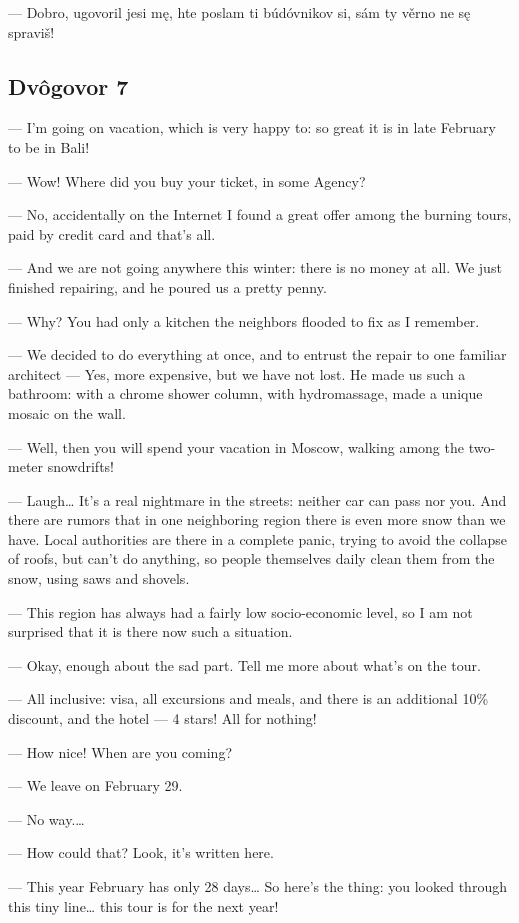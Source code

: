 — Dobro, ugovoril jesi mę, hte poslam ti búdóvnikov si, sám ty věrno ne sę spraviš!


\subsection{Dvôgovor 7}


— I’m going on vacation, which is very happy to: so great it is in late February to be in Bali!

— Wow! Where did you buy your ticket, in some Agency?

— No, accidentally on the Internet I found a great offer among the burning tours, paid by credit card and that’s all.

— And we are not going anywhere this winter: there is no money at all. We just finished repairing, and he poured us a pretty penny.

— Why? You had only a kitchen the neighbors flooded to fix as I remember.

— We decided to do everything at once, and to entrust the repair to one familiar architect — Yes, more expensive, but we have not lost. He made us such a bathroom: with a chrome shower column, with hydromassage, made a unique mosaic on the wall.

— Well, then you will spend your vacation in Moscow, walking among the two-meter snowdrifts!

— Laugh… It’s a real nightmare in the streets: neither car can pass nor you. And there are rumors that in one neighboring region there is even more snow than we have. Local authorities are there in a complete panic, trying to avoid the collapse of roofs, but can’t do anything, so people themselves daily clean them from the snow, using saws and shovels.

— This region has always had a fairly low socio-economic level, so I am not surprised that it is there now such a situation.

— Okay, enough about the sad part. Tell me more about what’s on the tour.

— All inclusive: visa, all excursions and meals, and there is an additional 10\% discount, and the hotel — 4 stars! All for nothing!

— How nice! When are you coming?

— We leave on February 29.

— No way.…

— How could that? Look, it’s written here.

— This year February has only 28 days… So here’s the thing: you looked through this tiny line… this tour is for the next year!

